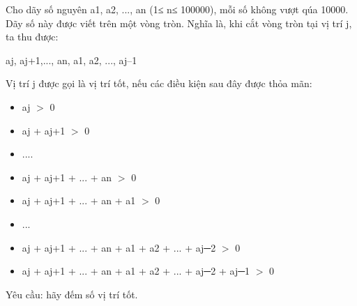 Cho dãy số nguyên a1, a2, ..., an (1≤ n≤ 100000), mỗi số không vượt qúa 10000. Dãy số này được viết trên một vòng tròn. Nghĩa là, khi cắt vòng   tròn tại vị trí j, ta thu được:  

   aj, aj+1,..., an, a1, a2, ..., aj–1  

   Vị trí j được gọi là vị trí tốt, nếu các điều kiện sau đây được thỏa mãn:  
\begin{itemize}
	\item     aj $>$ 0   
	\item     aj + aj+1 $>$ 0   
	\item     ....   
	\item     aj + aj+1 + ... + an $>$ 0   
	\item     aj + aj+1 + ... + an + a1 $>$ 0   
	\item     ...   
	\item     aj + aj+1 + ... + an + a1 + a2 + ... + aj─2 $>$ 0   
	\item     aj + aj+1 + ... + an + a1 + a2 + ... + aj─2 + aj─1 $>$ 0   
\end{itemize}

   Yêu cầu: hãy đếm số vị trí tốt.  

\